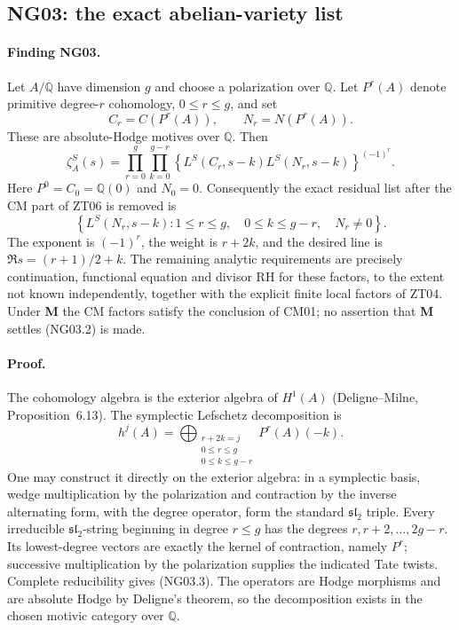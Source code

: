 \subsection{NG03: the exact abelian-variety list}
\label{NG03}

\paragraph{Finding NG03.}
Let $A/\mathbb Q$ have dimension $g$ and choose a polarization over
$\mathbb Q$.  Let $P^r(A)$ denote primitive degree-$r$ cohomology,
$0\le r\le g$, and set
\[
                  C_r=C(P^r(A)),\qquad N_r=N(P^r(A)).
\]
These are absolute-Hodge motives over $\mathbb Q$.  Then
\[
 \zeta_A^S(s)=
 \prod_{r=0}^g\prod_{k=0}^{g-r}
 \left\{L^S(C_r,s-k)L^S(N_r,s-k)\right\}^{(-1)^r}.            \tag{NG03.1}
\]
Here $P^0=C_0=\mathbb Q(0)$ and $N_0=0$.  Consequently the exact
residual list after the CM part of ZT06 is removed is
\[
 \boxed{\ \left\{L^S(N_r,s-k):1\le r\le g,\quad
                    0\le k\le g-r,\quad N_r\ne0\right\}.\ } \tag{NG03.2}
\]
The exponent is $(-1)^r$, the weight is $r+2k$, and the desired line is
$\Re s=(r+1)/2+k$.  The remaining analytic requirements are precisely
continuation, functional equation and divisor RH for these factors,
to the extent not known independently, together with the explicit
finite local factors of ZT04.  Under \textbf{M} the CM factors satisfy
the conclusion of CM01; no assertion that \textbf{M} settles
(NG03.2) is made.

\paragraph{Proof.}
The cohomology algebra is the exterior algebra of $H^1(A)$
(Deligne--Milne, Proposition~6.13).  The symplectic Lefschetz
decomposition is
\[
 h^j(A)=\bigoplus_{\substack{r+2k=j\\0\le r\le g\\0\le k\le g-r}}
                         P^r(A)(-k).                         \tag{NG03.3}
\]
One may construct it directly on the exterior algebra: in a symplectic
basis, wedge multiplication by the polarization and contraction by
the inverse alternating form, with the degree operator, form the
standard $\mathfrak{sl}_2$ triple.  Every irreducible
$\mathfrak{sl}_2$-string beginning in degree $r\le g$ has the degrees
$r,r+2,\ldots,2g-r$.  Its lowest-degree vectors are exactly the kernel
of contraction, namely $P^r$; successive multiplication by the
polarization supplies the indicated Tate twists.  Complete
reducibility gives (NG03.3).  The operators are Hodge morphisms and
are absolute Hodge by Deligne's theorem, so the decomposition exists
in the chosen motivic category over $\mathbb Q$.

